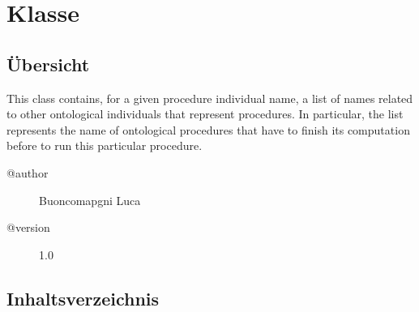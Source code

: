 
\section[OFProcedureSynchronisation]{Klasse }\label{ontologyFramework.OFProcedureManagment.OFProcedureSynchronisation-class}
\subsection{Übersicht}
This class contains, for a given procedure individual name,
 a list of names related to other ontological individuals that represent
 procedures. In particular,
 the list represents the name of ontological procedures that
 have to finish its computation before to run this particular
 procedure.
\begin{description}
\item[@author] 
Buoncomapgni Luca
\item[@version] 
1.0
\end{description}
\subsection{Inhaltsverzeichnis}

